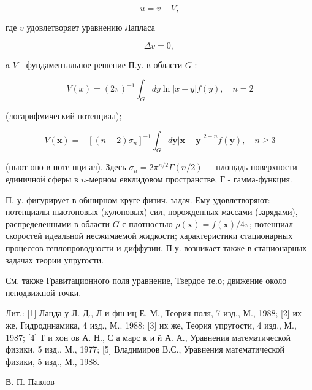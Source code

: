 \documentclass[10pt]{article}
\begin{document}
\[

u=v+V,

\]



где $v$ удовлетворяет уравнению Лапласа



\[

\Delta v=0 \text {, }

\]



a $V$ - фундаментальное решение П.у. в области $G$ :



\[

V(x)=(2 \pi)^{-1} \int_{G} d y \ln |x-y| f(y), \quad n=2

\]



(логарифмический потенциал);



\[

V(\boldsymbol{x})=-\left[(n-2) \sigma_{n}\right]^{-1} \int_{G} d \boldsymbol{y}|\boldsymbol{x}-\boldsymbol{y}|^{2-n} f(\boldsymbol{y}), \quad n \geqslant 3

\]



(ньют оно в поте нци ал). Здесь $\sigma_{n}=2 \pi^{n / 2} \Gamma(n / 2)-$ площадь поверхности единичной сферы в $n$-мерном евклидовом пространстве, Г - гамма-функция.



П. у. фигурирует в обширном круге физич. задач. Ему удовлетворяют: потенциалы ньютоновых (кулоновых) сил, порожденных массами (зарядами), распределенными в области $G$ с плотностью $\rho(\boldsymbol{x})=f(\boldsymbol{x}) / 4 \pi$; потенциал скоростей идеальной несжимаемой жидкости; характеристики стационарных процессов теплопроводности и диффузии. П.у. возникает также в стационарных задачах теории упругости.



См. также Гравитационного поля уравнение, Твердое те.о; движение около неподвижной точки.



Лит.: [1] Ланда у Л. Д., Л и фш иц Е. М., Теория поля, 7 изд., М., 1988; [2] их же, Гидродинамика, 4 изд., М.. 1988: [3] их же, Теория упругости, 4 изд., М., 1987; [4] Т и хон ов А. Н., С а марс к и й А. А., Уравнения математической физики. 5 изд.. М., 1977; [5] Владимиров В.С., Уравнения математической физики, 5 изд., М., 1988.



В. П. Павлов
\end{document}
